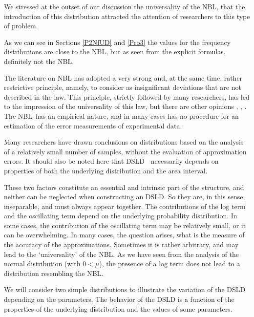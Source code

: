\documentclass[titlepage,fleqn]{article}%
\begin{document}
We stressed at the outset of our discussion the universality of the NBL, that
the introduction of this distribution attracted the attention of researchers
to this type of problem.

As we can see in Sections
\ref{P2NfUD} and \ref{Pro3}
the values for the frequency distributions are close to the NBL, but as seen
from the explicit formulas, definitely not the NBL.

The literature on NBL has adopted a very strong and, at the same time, rather
restrictive principle, namely, to consider as insignificant deviations that
are not described in the law. This principle, strictly followed by many
researchers, has led to the impression of the universality of this law, but
there are other opinions
\cite{arnold0},
\cite{arnold1},
\cite{bergerhill}%
. The NBL\ has an empirical nature, and in many cases has no procedure for an
estimation of the error measurements of experimental data.

Many researchers have drawn conclusions on distributions based on the analysis
of a relatively small number of samples, without the evaluation of
approximation errors. It should also be noted here that DSLD\textbf{\ }%
necessarily depends on properties of both the underlying distribution and the
area interval.

These two factors constitute an essential and intrinsic part of the structure,
and neither can be neglected when constructing an DSLD. So they are, in this
sense, inseparable, and must always appear together. The contributions of the
log term and the oscillating term depend on the underlying probability
distribution. In some cases, the contribution of the oscillating term may be
relatively small, or it can be overwhelming. In many cases, the question
arises, what is the measure of the accuracy of the approximations. Sometimes
it is rather arbitrary, and may lead to the `universality' of the NBL. As we
have seen from the analysis of the normal distribution (with $0<\mu$), the
presence of a log term does not lead to a distribution resembling the NBL.

We will consider two simple distributions to illustrate the variation of the
DSLD depending on the parameters. The behavior of the DSLD is a function of
the properties of the underlying distribution and the values of some parameters.
\end{document}
